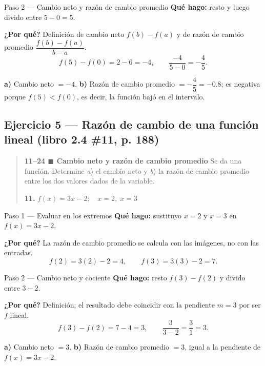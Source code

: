 \documentclass[11pt]{article}
\begin{document}
\begin{paso}{Paso 2 --- Cambio neto y razón de cambio promedio}
\textbf{Qué hago:} resto y luego divido entre $5-0=5$.

\textbf{¿Por qué?} Definición de cambio neto $f(b)-f(a)$ y de razón de cambio promedio $\dfrac{f(b)-f(a)}{b-a}$.
\[
f(5)-f(0)=2-6=-4,\qquad \frac{-4}{5-0}=-\frac{4}{5}.
\]
\end{paso}

\begin{resp}
\textbf{a)} Cambio neto $=-4$. \qquad \textbf{b)} Razón de cambio promedio $=-\dfrac{4}{5}=-0.8$; es negativa porque $f(5)<f(0)$, es decir, la función bajó en el intervalo.
\end{resp}

\subsection*{Ejercicio 5 — Razón de cambio de una función lineal (libro 2.4 \#11, p. 188)}

\begin{quote}
\textbf{11--24 $\blacksquare$ Cambio neto y razón de cambio promedio} \; Se da una función. Determine \emph{a}) el cambio neto y \emph{b}) la razón de cambio promedio entre los dos valores dados de la variable.

\textbf{11.} $f(x)=3x-2;\quad x=2,\;x=3$
\end{quote}

\begin{paso}{Paso 1 --- Evaluar en los extremos}
\textbf{Qué hago:} sustituyo $x=2$ y $x=3$ en $f(x)=3x-2$.

\textbf{¿Por qué?} La razón de cambio promedio se calcula con las imágenes, no con las entradas.
\[
f(2)=3(2)-2=4,\qquad f(3)=3(3)-2=7.
\]
\end{paso}

\begin{paso}{Paso 2 --- Cambio neto y cociente}
\textbf{Qué hago:} resto $f(3)-f(2)$ y divido entre $3-2$.

\textbf{¿Por qué?} Definición; el resultado debe coincidir con la pendiente $m=3$ por ser $f$ lineal.
\[
f(3)-f(2)=7-4=3,\qquad \frac{3}{3-2}=\frac{3}{1}=3.
\]
\end{paso}

\begin{resp}
\textbf{a)} Cambio neto $=3$. \qquad \textbf{b)} Razón de cambio promedio $=3$, igual a la pendiente de $f(x)=3x-2$.
\end{resp}
\end{document}
